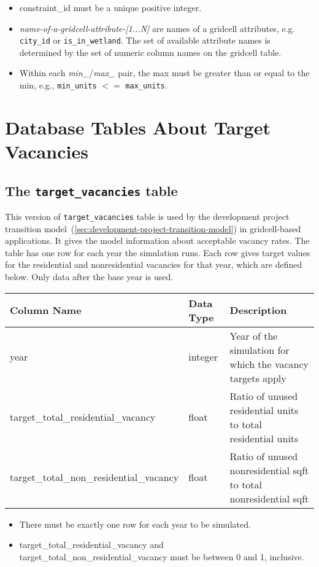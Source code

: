 \begin{itemize}
\tight
\item constraint_id must be a unique positive integer.

\item \emph{name-of-a-gridcell-attribute-[1...N]} are names of a gridcell attributes,
e.g. \verb|city_id| or \verb|is_in_wetland|.  The set of available attribute
names is determined by the set of numeric column names on the gridcell table.

\item Within each \emph{min_}/\emph{max_} pair, the max must be greater than or
equal to the min, e.g., \verb|min_units| $<=$ \verb|max_units|.

\end{itemize}

\section{Database Tables About Target Vacancies}

\subsection{The {\tt target_vacancies} table}
\label{sec:table-target-vacancies-gridcell}

This version of \verb|target_vacancies| table is used by the development project transition
model~(\ref{sec:development-project-transition-model}) in gridcell-based applications. 
It gives the model information about acceptable vacancy rates. The table
has one row for each year the simulation runs. Each row gives target values for
the residential and nonresidential vacancies for that year, which are defined
below.  Only data after the base year is used.

\begin{tabular}{lll}

\textbf{Column Name} & \textbf{Data Type} & \textbf{Description} \\

\hline year & integer & Year of the simulation for which the vacancy
targets
apply  \\

\hline target_total_residential_vacancy & float & Ratio of unused residential
units to total residential units  \\

\hline target_total_non_residential_vacancy & float & Ratio of unused
nonresidential sqft to total nonresidential sqft  \\

\hline
\end{tabular}

\begin{itemize}
\tight
\item There must be exactly one row for each year to be simulated.
\item target_total_residential_vacancy and target_total_non_residential_vacancy must be between 0 and 1, inclusive.
\end{itemize}


